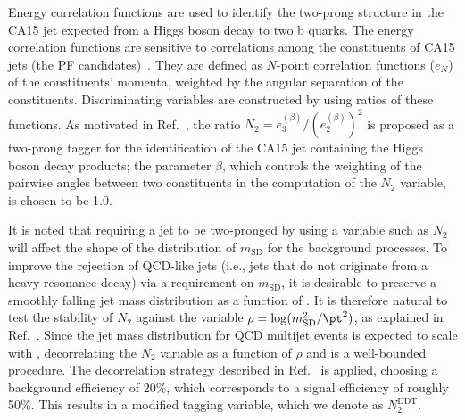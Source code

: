 Energy correlation functions are used to identify the two-prong
structure in the CA15 jet expected from a Higgs boson decay to two b
quarks. The energy correlation functions are sensitive to correlations among the constituents
of CA15 jets (the PF candidates)~\cite{ecf}. They are defined as $N$-point correlation functions ($e_N$) of the constituents' momenta, weighted by the angular separation of the constituents. Discriminating variables are constructed by using ratios of these functions.
%                                                                                                                                                                                                
As motivated in Ref.~\cite{ecf}, the ratio $N_2 =
e_3^{(\beta)}/(e_2^{(\beta)})^2$ is proposed as a two-prong tagger for
the identification of the CA15 jet containing the Higgs boson decay
products; the parameter $\beta$, which controls the weighting of the
pairwise angles between two constituents in the computation of
the $N_2$ variable, is chosen to be 1.0. 



It is noted that requiring a jet to be two-pronged by using a variable
such as $N_2$ will affect the shape of the distribution of $m_\text{SD}$ for the
background processes. To improve the rejection of QCD-like jets (i.e., jets that
do not originate from a heavy resonance decay) via a requirement on
$m_\text{SD}$, it is desirable to preserve a smoothly falling jet mass
distribution  as a function of \pt. It is therefore natural to test
the stability of $N_2$ against the variable
$\rho=\log(m_{\text{SD}}^2/\pt^2)$, as explained in
Ref.~\cite{ddt}. Since the jet mass distribution for QCD multijet
events is expected to scale with \pt, decorrelating the $N_2$ variable
as a function of $\rho$ and \pt is a well-bounded procedure. The
decorrelation strategy described in Ref.~\cite{ddt} is applied,
choosing a background efficiency of 20\%, which corresponds to a
signal efficiency of roughly 50\%. This results in a modified tagging
variable, which we denote as $N_2^\text{DDT}$.


